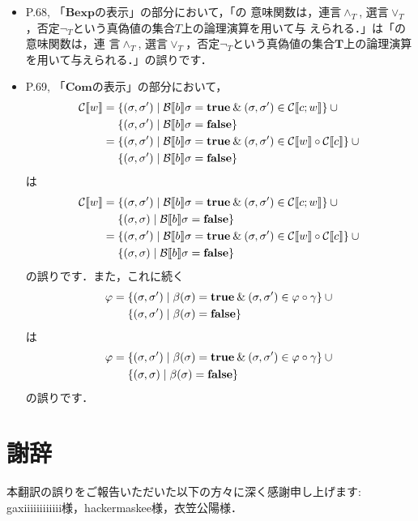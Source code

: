 \documentclass[12pt,titlepage,twoside,openright,dvipdfmx]{jsbook}
\theoremstyle{definition}
\begin{document}
\begin{itemize}
\item P.68,
  「$\mathbf{Bexp}$の表示」の部分において，「\termbooleanexpression{}の
  意味関数は，連言$\wedge_T$,
  選言$\vee_T$，否定$\neg_T$という真偽値の集合$T$上の論理演算を用いて与
  えられる．」は「\termbooleanexpression{}の意味関数は，連
  言$\wedge_T$,
  選言$\vee_T$，否定$\neg_T$という真偽値の集合$\mathbf{T}$上の論理演算
  を用いて与えられる．」の誤りです．
\item P.69, 「$\mathbf{Com}$の表示」の部分において，
  \begin{align*}
      \mathcal{C}\llbracket{w}\rrbracket = {} & \{(\sigma,\sigma')\mid  \mathcal{B}\llbracket{b}\rrbracket\sigma=\mathbf{true} \mathbin{\&} (\sigma,\sigma')\in\mathcal{C}\llbracket{c;w}\rrbracket\}\cup {}\\
                             & \{(\sigma,\sigma')\mid  \mathcal{B}\llbracket{b}\rrbracket\sigma=\mathbf{false}\} \\
      = {} & \{(\sigma,\sigma')\mid  \mathcal{B}\llbracket{b}\rrbracket\sigma=\mathbf{true} \mathbin{\&} (\sigma,\sigma')\in \mathcal{C}\llbracket{w}\rrbracket \circ \mathcal{C}\llbracket{c}\rrbracket \}\cup {}\\
                             & \{(\sigma,\sigma')\mid  \mathcal{B}\llbracket{b}\rrbracket\sigma=\mathbf{false}\}
  \end{align*}
  は
  \begin{align*}
      \mathcal{C}\llbracket{w}\rrbracket = {} & \{(\sigma,\sigma')\mid  \mathcal{B}\llbracket{b}\rrbracket\sigma=\mathbf{true} \mathbin{\&} (\sigma,\sigma')\in\mathcal{C}\llbracket{c;w}\rrbracket\}\cup {}\\
                             & \{(\sigma,\sigma)\mid  \mathcal{B}\llbracket{b}\rrbracket\sigma=\mathbf{false}\} \\
      = {} & \{(\sigma,\sigma')\mid  \mathcal{B}\llbracket{b}\rrbracket\sigma=\mathbf{true} \mathbin{\&} (\sigma,\sigma')\in \mathcal{C}\llbracket{w}\rrbracket \circ \mathcal{C}\llbracket{c}\rrbracket \}\cup {}\\
                             & \{(\sigma,\sigma)\mid  \mathcal{B}\llbracket{b}\rrbracket\sigma=\mathbf{false}\}
  \end{align*}
  の誤りです．また，これに続く
  \begin{align*}
    \varphi = {} & \{(\sigma,\sigma')\mid \beta(\sigma)=\mathbf{true} \mathbin{\&}
                   (\sigma,\sigma')\in \varphi\circ\gamma \} \cup {} \\
                 & \{(\sigma,\sigma')\mid \beta(\sigma)=\mathbf{false} \}
  \end{align*}
  は
  \begin{align*}
    \varphi = {} & \{(\sigma,\sigma')\mid \beta(\sigma)=\mathbf{true} \mathbin{\&}
                   (\sigma,\sigma')\in \varphi\circ\gamma \} \cup {} \\
                 & \{(\sigma,\sigma)\mid \beta(\sigma)=\mathbf{false} \}
  \end{align*}
  の誤りです．
\end{itemize}

\section*{謝辞}

本翻訳の誤りをご報告いただいた以下の方々に深く感謝申し上げます: gaxiiiiiiiiiiii様，hackermaskee様，衣笠公陽様．
\end{document}
